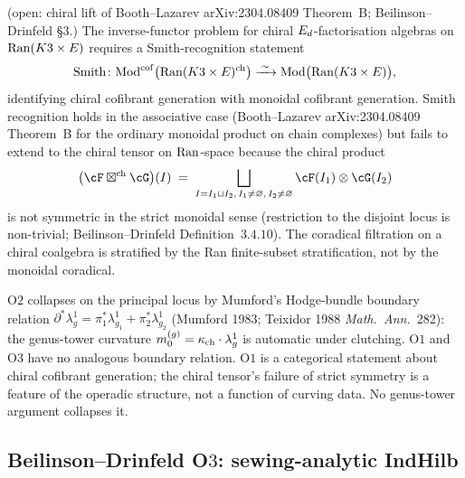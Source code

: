 \begin{theorem}
\label{thm:agent08-O1-ran-smith}
\ClaimStatusConditional{} \textup{(open: chiral lift of Booth--Lazarev
arXiv:2304.08409 Theorem~B; Beilinson--Drinfeld
\cite{BeilinsonDrinfeld2004} \S$3$.)}
The inverse-functor problem for chiral $E_d$-factorisation algebras on
$\mathrm{Ran}(K3\times E)$ requires a Smith-recognition statement
\[
\mathrm{Smith} \colon
\mathrm{Mod}^{\mathrm{cof}}\bigl(\mathrm{Ran}(K3\times E)^{\mathrm{ch}}\bigr)
 \xrightarrow{\;\sim\;}
 \mathrm{Mod}\bigl(\mathrm{Ran}(K3\times E)\bigr),
\]
identifying chiral cofibrant generation with monoidal cofibrant
generation. Smith recognition holds in the associative case
\textup{(}Booth--Lazarev arXiv:2304.08409 Theorem~B for the
ordinary monoidal product on chain complexes\textup{)} but fails to
extend to the chiral tensor on $\mathrm{Ran}$-space because the chiral product
\[
\bigl(\cF\boxtimes^{\mathrm{ch}}\cG\bigr)(I) \;=\;
\bigsqcup_{I = I_1\sqcup I_2,\, I_1\neq\varnothing,\, I_2\neq\varnothing}
\cF(I_1)\otimes\cG(I_2)
\]
is not symmetric in the strict monoidal sense \textup{(}restriction to
the disjoint locus is non-trivial; Beilinson--Drinfeld
\cite{BeilinsonDrinfeld2004} Definition~$3.4.10$\textup{).} The
coradical filtration on a chiral coalgebra is stratified by the Ran
finite-subset stratification, not by the monoidal coradical.
\end{theorem}

\begin{remark}
\label{rem:agent08-O1-no-collapse}
O$2$ collapses on the principal locus by Mumford's Hodge-bundle boundary
relation $\partial^*\lambda_g^1=\pi_1^*\lambda_{g_1}^1+\pi_2^*\lambda_{g_2}^1$
\textup{(}Mumford 1983; Teixidor 1988 \emph{Math.\ Ann.}~282\textup{):}
the genus-tower curvature $m_0^{(g)}=\kappa_{\mathrm{ch}}\cdot\lambda_g^1$ is automatic
under clutching. O$1$ and O$3$ have no analogous boundary relation. O$1$
is a categorical statement about chiral cofibrant generation; the chiral
tensor's failure of strict symmetry is a feature of the operadic
structure, not a function of curving data. No genus-tower argument
collapses it.
\end{remark}

\subsection{Beilinson--Drinfeld O\texorpdfstring{$3$}{3}: sewing-analytic IndHilb}
\label{wn:subsec:agent08-O3-sewing}

